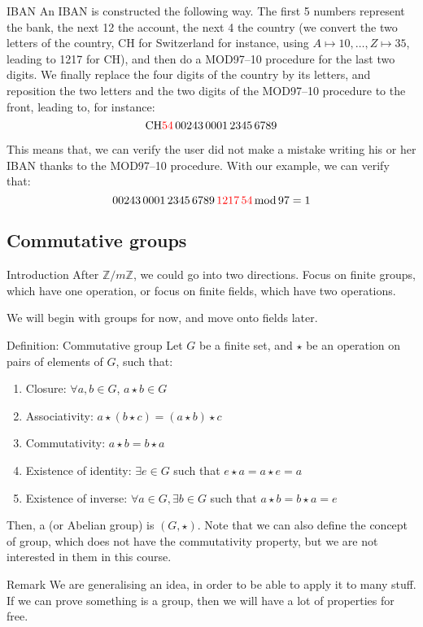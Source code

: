 \documentclass[a4paper]{article}
\begin{document}
\begin{parag}{IBAN}
    An IBAN is constructed the following way. The first 5 numbers represent the bank, the next 12 the account, the next 4 the country (we convert the two letters of the country, CH for Switzerland for instance, using $A \mapsto 10, \ldots, Z \mapsto 35$, leading to 1217 for CH), and then do a MOD97--10 procedure for the last two digits. We finally replace the four digits of the country by its letters, and reposition the two letters and the two digits of the MOD97--10 procedure to the front, leading to, for instance: 
    \[\text{CH}{\color{red}54}\,00243\,0001\,2345\,6789\]

    This means that, we can verify the user did not make a mistake writing his or her IBAN thanks to the MOD97--10 procedure. With our example, we can verify that: 
    \[00243\,0001\,2345\,6789\,{\color{red}1217\,54} \operatorname{mod} 97 = 1\]
\end{parag}

\subsection{Commutative groups}
\begin{parag}{Introduction}
    After $\mathbb{Z} / m\mathbb{Z}$, we could go into two directions. Focus on finite groups, which have one operation, or focus on finite fields, which have two operations. 

    We will begin with groups for now, and move onto fields later.
\end{parag}

\begin{parag}{Definition: Commutative group}
    Let $G$ be a finite set, and $\star$ be an operation on pairs of elements of $G$, such that:
    \begin{enumerate}
        \item Closure: $\forall a, b \in G$, $a \star b \in G$
        \item Associativity: $a \star \left(b \star c\right) = \left(a \star b\right) \star c$
        \item Commutativity: $a\star b = b \star a$
        \item Existence of identity: $\exists e \in G$ such that $e \star a = a\star e = a$
        \item Existence of inverse: $\forall a \in G, \exists b \in G$ such that $a \star b = b\star a = e$
    \end{enumerate}

    Then, a  (or Abelian group) is $\left(G, \star\right)$. Note that we can also define the concept of group, which does not have the commutativity property, but we are not interested in them in this course.

    \begin{subparag}{Remark}
        We are generalising an idea, in order to be able to apply it to many stuff. If we can prove something is a group, then we will have a lot of properties for free.
    \end{subparag}
\end{parag}
\end{document}
